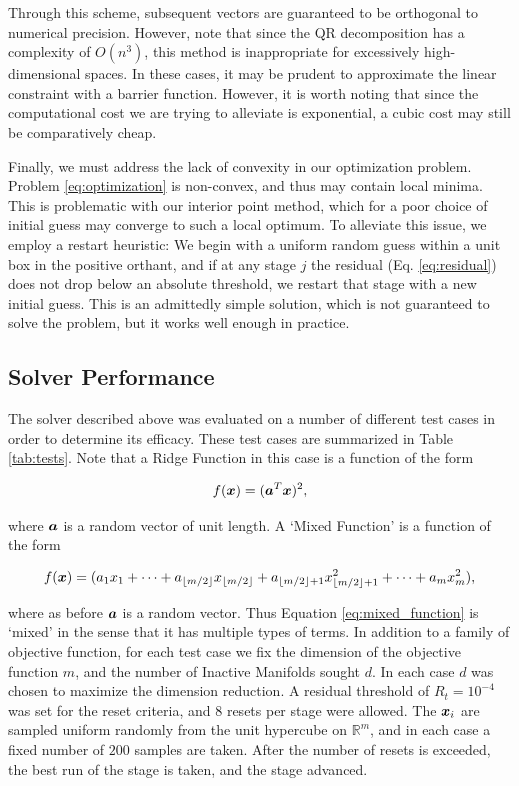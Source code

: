 \documentclass[]{aiaa-tc}%
\begin{document}
Through this scheme, subsequent vectors are guaranteed to be orthogonal to numerical precision. However, note that since the QR decomposition has a complexity of $O(n^3)$, this method is inappropriate for excessively high-dimensional spaces. In these cases, it may be prudent to approximate the linear constraint with a barrier function. However, it is worth noting that since the computational cost we are trying to alleviate is exponential, a cubic cost may still be comparatively cheap.

Finally, we must address the lack of convexity in our optimization problem. Problem \ref{eq:optimization} is non-convex, and thus may contain local minima. This is problematic with our interior point method, which for a poor choice of initial guess may converge to such a local optimum. To alleviate this issue, we employ a restart heuristic: We begin with a uniform random guess within a unit box in the positive orthant, and if at any stage $j$ the residual (Eq. \ref{eq:residual}) does not drop below an absolute threshold, we restart that stage with a new initial guess. This is an admittedly simple solution, which is not guaranteed to solve the problem, but it works well enough in practice.

\subsection{Solver Performance} \label{sec:solver_performance}
The solver described above was evaluated on a number of different test cases in order to determine its efficacy. These test cases are summarized in Table \ref{tab:tests}. Note that a Ridge Function in this case is a function of the form 

\begin{equation}
\label{eq:ridge_function}
f(\vx)=(\va^T\vx)^2, 
\end{equation}

where $\boldsymbol{a}$ is a random vector of unit length. A `Mixed Function' is a function of the form 

\begin{equation}
\label{eq:mixed_function}
f(\vx)=(a_1x_1+\dots+a_{\floor*{m/2}}x_{\floor*{m/2}}+a_{\floor*{m/2}+1}x_{\floor*{m/2}+1}^2+\dots+a_mx_m^2),
\end{equation}

where as before $\boldsymbol{a}$ is a random vector. Thus Equation \ref{eq:mixed_function} is `mixed' in the sense that it has multiple types of terms. In addition to a family of objective function, for each test case we fix the dimension of the objective function $m$, and the number of Inactive Manifolds sought $d$. In each case $d$ was chosen to maximize the dimension reduction. A residual threshold of $R_t=10^{-4}$ was set for the reset criteria, and $8$ resets per stage were allowed. The $\boldsymbol{x}_i$ are sampled uniform randomly from the unit hypercube on $\mathbb{R}^m$, and in each case a fixed number of $200$ samples are taken. After the number of resets is exceeded, the best run of the stage is taken, and the stage advanced.
\end{document}
